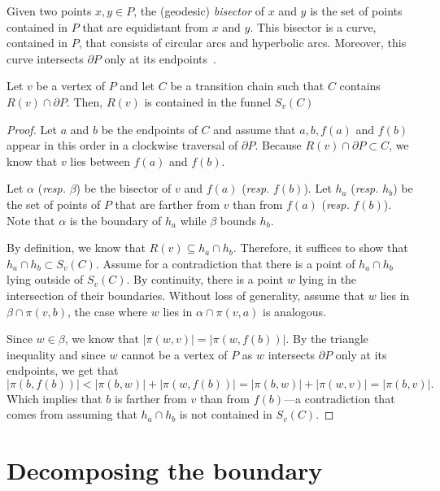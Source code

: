 \documentclass[a4paper,UKenglish]{lipics}
\newcommand{\fn}[2]{\ensuremath{S_{\scriptscriptstyle #1}(#2)}}
\newcommand{\ff}[1]{\ensuremath{f(#1)}}
\newcommand{\g}[2]{\ensuremath{|\pi(#1, #2)|}}
\newcommand{\p}[2]{\ensuremath{\pi(#1, #2)}}
\begin{document}
Given two points $x,y\in P$, the (geodesic) \emph{bisector} of $x$ and $y$ is the set of points contained in $P$ that are equidistant from $x$ and $y$. This bisector is a curve, contained in $P$, that consists of circular arcs and hyperbolic arcs. Moreover, this curve intersects $\partial P$ only at its endpoints~\cite[Lemma 3.22]{aronov1989geodesic}.

\begin{lemma}\label{lemma:Funnel contains Voronoi region}
Let $v$ be a vertex of $P$ and let $C$ be a transition chain such that $C$ contains $R(v)\cap \partial P$.
Then, $R(v)$ is contained in the funnel $\fn{v}{C}$
\end{lemma}
\begin{proof}
Let $a$ and $b$ be the endpoints of $C$ and assume that $a,b, \ff{a}$ and $\ff{b}$ appear in this order in a clockwise traversal of $\partial P$.
Because $R(v)\cap \partial P\subset C$, we know that $v$ lies between $\ff{a}$ and $\ff{b}$.

Let $\alpha$ (\emph{resp.} $\beta$) be the bisector of $v$ and $\ff{a}$ (\emph{resp.} $\ff{b}$).
Let $h_a$ (\emph{resp.} $h_b$) be the set of points of $P$ that are farther from $v$ than from $\ff{a}$ (\emph{resp.} $\ff{b}$).
Note that $\alpha$ is the boundary of $h_a$ while $\beta$ bounds $h_b$.

By definition, we know that $R(v)\subseteq h_a\cap h_b$. Therefore, it suffices to show that $h_a\cap h_b\subset \fn{v}{C}$.
Assume for a contradiction that there is a point of $h_a\cap h_b$ lying outside of $\fn{v}{C}$. By continuity, there is a point $w$ lying in the intersection of their boundaries. 
Without loss of generality, assume that $w$ lies in $\beta \cap \p{v}{b}$, the case where $w$ lies in $\alpha \cap \p{v}{a}$ is analogous. 

Since $w\in \beta$, we know that $\g{w}{v} = \g{w}{ \ff{b}}$. By the triangle inequality and since $w$ cannot be a vertex of $P$ as $w$ intersects $\partial P$ only at its endpoints, we get that
$$\g{b}{\ff{b}} < \g{b}{w} + \g{w}{\ff{b}} = \g{b}{w} + \g{w}{v} = \g{b}{v}.$$
Which implies that $b$ is farther from $v$ than from $\ff{b}$---a contradiction that comes from assuming that $h_a\cap h_b$ is not contained in $\fn{v}{C}$.
\end{proof}

\section{Decomposing the boundary}
\end{document}
